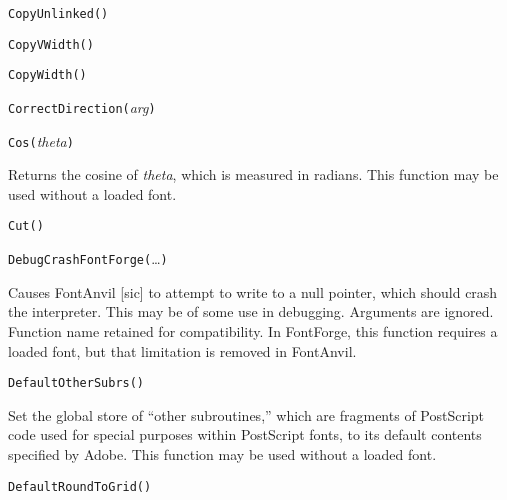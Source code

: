 \texttt{CopyUnlinked(}\texttt{)}



\texttt{CopyVWidth(}\texttt{)}



\texttt{CopyWidth(}\texttt{)}



\texttt{CorrectDirection(}\textit{arg}\texttt{)}



\texttt{Cos(}\textit{theta}\texttt{)}

Returns the cosine of \textit{theta}, which is measured in radians.
This function may be used without a loaded font.



\texttt{Cut(}\texttt{)}



\texttt{DebugCrashFontForge(}\ldots\texttt{)}

Causes FontAnvil [sic] to attempt to write to a null pointer, which should
crash the interpreter.  This may be of some use in debugging.  Arguments are
ignored.  Function name retained for compatibility.  In \FFdiff FontForge,
this function requires a loaded font, but that limitation is removed in
FontAnvil.



\texttt{DefaultOtherSubrs(}\texttt{)}

Set the global store of ``other subroutines,'' which are fragments of
PostScript code used for special purposes within PostScript fonts, to its
default contents specified by Adobe.  This function may be used without a
loaded font.



\texttt{DefaultRoundToGrid(}\texttt{)}

